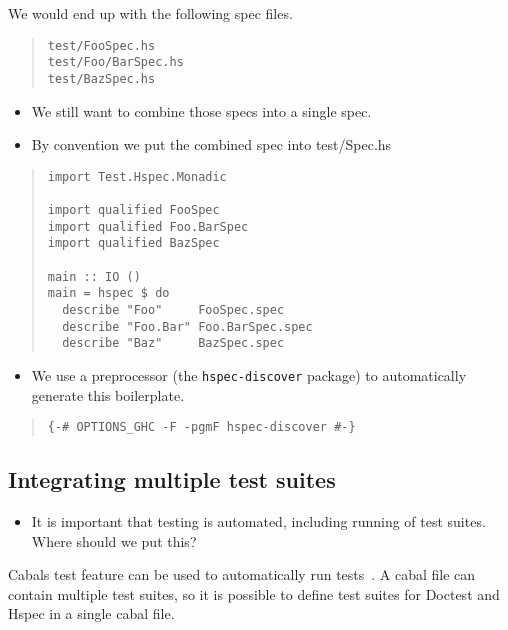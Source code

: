 \documentclass[preprint]{sigplanconf}
\begin{document}
\noindent We would end up with the following spec files.

\begin{quote}
\small
\begin{verbatim}
test/FooSpec.hs
test/Foo/BarSpec.hs
test/BazSpec.hs
\end{verbatim}
\end{quote}

\begin{itemize}
\item We still want to combine those specs into a single spec.
\item By convention we put the combined spec into test/Spec.hs
\end{itemize}

\begin{quote}
\small
\begin{verbatim}
import Test.Hspec.Monadic

import qualified FooSpec
import qualified Foo.BarSpec
import qualified BazSpec

main :: IO ()
main = hspec $ do
  describe "Foo"     FooSpec.spec
  describe "Foo.Bar" Foo.BarSpec.spec
  describe "Baz"     BazSpec.spec
\end{verbatim}
\end{quote}

\begin{itemize}
\item We use a preprocessor (the {\tt hspec-discover} package) to automatically generate this boilerplate.
\end{itemize}

\begin{quote}
\small
\begin{verbatim}
{-# OPTIONS_GHC -F -pgmF hspec-discover #-}
\end{verbatim}
\end{quote}

\subsection{Integrating multiple test suites}

\begin{itemize}

\item It is important that testing is automated, including running of test
    suites.  Where should we put this?
\end{itemize}

\noindent Cabals test feature can be used to automatically run tests~\cite{cabal}.  A cabal
file can contain multiple test suites, so it is possible to define test suites
for Doctest and Hspec in a single cabal file.
\end{document}
